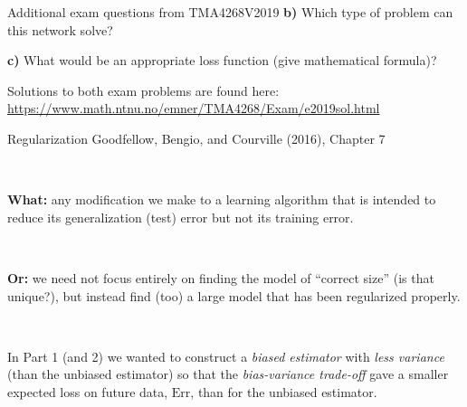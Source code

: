 \documentclass[
  ignorenonframetext,
]{beamer}
\begin{document}
\begin{frame}
\begin{block}{Additional exam questions from TMA4268V2019}
\textbf{b)} Which type of problem can this network solve?

\textbf{c)} What would be an appropriate loss function (give
mathematical formula)?

Solutions to both exam problems are found here:
\url{https://www.math.ntnu.no/emner/TMA4268/Exam/e2019sol.html}
\end{block}
\end{frame}

\begin{frame}{Regularization}
\protect\hypertarget{regularization}{}
Goodfellow, Bengio, and Courville (2016), Chapter 7

\(~\)

\textbf{What:} any modification we make to a learning algorithm that is
intended to reduce its generalization (test) error but not its training
error.

\(~\)

\textbf{Or:} we need not focus entirely on finding the model of
``correct size'' (is that unique?), but instead find (too) a large model
that has been regularized properly.

\(~\)

In Part 1 (and 2) we wanted to construct a \emph{biased estimator} with
\emph{less variance} (than the unbiased estimator) so that the
\emph{bias-variance trade-off} gave a smaller expected loss on future
data, \(\text{Err}\), than for the unbiased estimator.
\end{frame}
\end{document}
